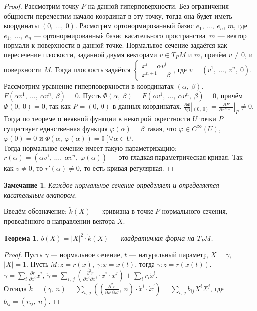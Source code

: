 \documentclass[12pt]{article}
\theoremstyle{plain}
\newtheorem{theorem}{Теорема}[section]
\newtheorem{remark}{Замечание}
\renewcommand{\phi}{\varphi}
\begin{document}
    \begin{proof}
        Рассмотрим точку $P$ на данной гиперповерхности. Без ограничения общности переместим начало координат в эту точку, тогда она будет иметь координаты $(0, \ \ldots, \ 0)$. Расмотрим ортонормированный базис $e_1, \ \ldots, \ e_n$, $m$, где $e_1, \ \ldots, \ e_n$ --- ортонормированный базис касательного пространства, $m$ --- вектор нормали к поверхности в данной точке. Нормальное сечение задаётся как пересечение плоскости, заданной двумя векторами $v\in T_PM$ и $m$, причём $v\neq 0$, и поверхности $M$. Тогда плоскость задаётся $\begin{cases}
            x^i=\alpha v^i\\
            x^{n+1}=\beta
        \end{cases}$, где $v=(v^1, \ \ldots, \ v^n, \ 0)$. Рассмотрим уравнение гиперповерхности в координатах $(\alpha, \ \beta)$. $F(\alpha v^1, \ \ldots, \ \alpha v^n, \ \beta)=0$. Пусть $\Phi(\alpha, \ \beta)=F(\alpha v^1, \ \ldots, \ \alpha v^n, \ \beta)=0$, причём $\Phi(0, \ 0)=0$, так как $P=(0, \ 0)$ в данных координатах. $\frac{\partial\Phi}{\partial\beta}|_{(0, \ 0)}=\frac{\partial F}{\partial x^{n+1}}|_{P}\neq0$. Тогда по теореме о неявной функции в некотрой окрестности $U$ точки $P$ существует единственная функция $\phi(\alpha)=\beta$ такая, что $\phi\in C^{\infty}(U)$, $\phi(0)=0$ и $\Phi(\alpha, \ \phi(\alpha))=0$ $]\forall\alpha\in U$.\\
        Тогда нормальное сечение имеет такую параметризацию: $r(\alpha)=(\alpha v^1, \ \ldots, \ \alpha v^n, \ \phi(\alpha))$ --- это гладкая параметрическая кривая. Так как $v\neq0$, то $r'(\alpha)\neq0$, то есть кривая регулярная.
    \end{proof}
    \begin{remark}
        Каждое нормальное сечение определяет и определяется касательным вектором.
    \end{remark}
    Введём обозначение: $\tilde{k}(X)$ --- кривизна в точке $P$ нормального сечения, проведённого в направлении вектора $X$.
    \begin{theorem}
        $b(X)=|X|^2\cdot\tilde{k}(X)$ --- квадратичная форма на $T_PM$.
    \end{theorem}
    \begin{proof}
        Пусть $\gamma$ --- нормальное сечение, $t$ --- натуральный параметр, $X=\dot{\gamma}$, $|X|=1$. Пусть $M:z=r(x)$, $\gamma:x=x(t)$, тогда $\gamma:z=r(x(t))$.\\
        $\dot{\gamma}=\sum\limits_i\frac{\partial r}{\partial x^i}\dot{x}^i$, $\ddot{\gamma}=\sum\limits_{i, \ j}\left(\frac{\partial^2r}{\partial x^i\partial x^j}\cdot\dot{x}^i\cdot\dot{x}^j\right)+\sum\limits_ir_i\ddot{x}^i$.\\
        Отсюда $\tilde{k}=(\ddot{\gamma}, \ n)=\sum\limits_{i, \ j}\left((\frac{\partial^2r}{\partial x^i\partial x^j}, \ n)\cdot\dot{x}^i\cdot\dot{x}^j\right)=\sum\limits_{i, \ j}b_{ij}X^iX^j$, где $b_{ij}=(r_{ij}, \ n)$.
    \end{proof}
\end{document}
